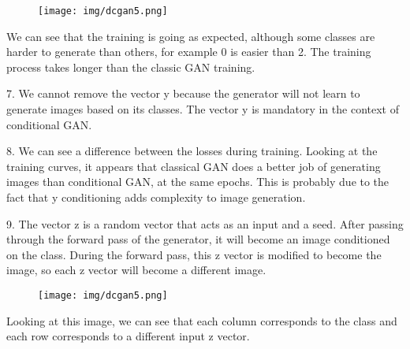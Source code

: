 \begin{figure}[H]
  \centering
    \texttt{[image: img/dcgan5.png]}
\end{figure}

We can see that the training is going as expected, although some classes are harder to generate than others, for example 0 is easier than 2. The training process takes longer than the classic GAN training.

7. We cannot remove the vector y because the generator will not learn to generate images based on its classes. The vector y is mandatory in the context of conditional GAN.

8. We can see a difference between the losses during training. Looking at the training curves, it appears that classical GAN does a better job of generating images than conditional GAN, at the same epochs. This is probably due to the fact that y conditioning adds complexity to image generation.

9. The vector z is a random vector that acts as an input and a seed. After passing through the forward pass of the generator, it will become an image conditioned on the class. During the forward pass, this z vector is modified to become the image, so each z vector will become a different image. 

\begin{figure}[H]
  \centering
    \texttt{[image: img/dcgan5.png]}
\end{figure}

Looking at this image, we can see that each column corresponds to the class and each row corresponds to a different input z vector. 
